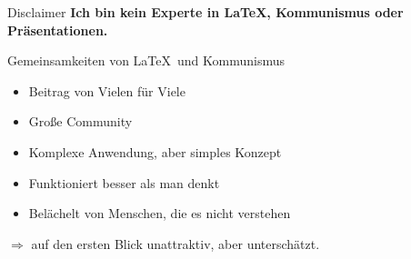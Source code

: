 \documentclass{beamer}
\begin{document}
\begin{frame}{Disclaimer}
\textbf{Ich bin kein Experte in \LaTeX, Kommunismus oder Präsentationen.}
\end{frame}
\begin{frame}{Gemeinsamkeiten von \LaTeX \ und Kommunismus}
    \begin{itemize}
        \item<2-> Beitrag von Vielen für Viele
        \item<3-> Große Community
        \item<4-> Komplexe Anwendung, aber simples Konzept
        \item<5-> Funktioniert besser als man denkt
        \item<6-> Belächelt von Menschen, die es nicht verstehen
    \end{itemize}

        $\Rightarrow$ auf den ersten Blick unattraktiv, aber unterschätzt.
\end{frame}
\end{document}
